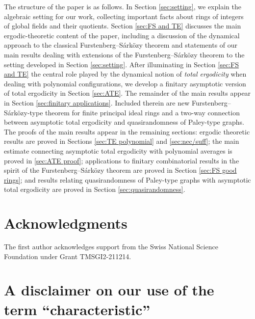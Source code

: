\documentclass{amsart}
\theoremstyle{definition}
\numberwithin{equation}{section}
\begin{document}
The structure of the paper is as follows.
In Section \ref{sec:setting}, we explain the algebraic setting for our work, collecting important facts about rings of integers of global fields and their quotients.
Section \ref{sec:FS and TE} discusses the main ergodic-theoretic content of the paper, including a discussion of the dynamical approach to the classical Furstenberg--S\'{a}rk\"{o}zy theorem and statements of our main results dealing with extensions of the Furstenberg--S\'{a}rk\"{o}zy theorem to the setting developed in Section \ref{sec:setting}.
After illuminating in Section \ref{sec:FS and TE} the central role played by the dynamical notion of \emph{total ergodicity} when dealing with polynomial configurations, we develop a finitary asymptotic version of total ergodicity in Section \ref{sec:ATE}.
The remainder of the main results appear in Section \ref{sec:finitary applications}.
Included therein are new Furstenberg--S\'{a}rk\"{o}zy-type theorem for finite principal ideal rings and a two-way connection between asymptotic total ergodicity and quasirandomness of Paley-type graphs.
The proofs of the main results appear in the remaining sections: ergodic theoretic results are proved in Sections \ref{sec:TE polynomial} and \ref{sec:nec/suff}; the main estimate connecting asymptotic total ergodicity with polynomial averages is proved in \ref{sec:ATE proof}; applications to finitary combinatorial results in the spirit of the Furstenberg--S\'{a}rk\"{o}zy theorem are proved in Section \ref{sec:FS good rings}; and results relating quasirandomness of Paley-type graphs with asymptotic total ergodicity are proved in Section \ref{sec:quasirandomness}.


\section*{Acknowledgments}

The first author acknowledges support from the Swiss National Science Foundation under Grant TMSGI2-211214.


\section{A disclaimer on our use of the term ``characteristic''}
\end{document}
